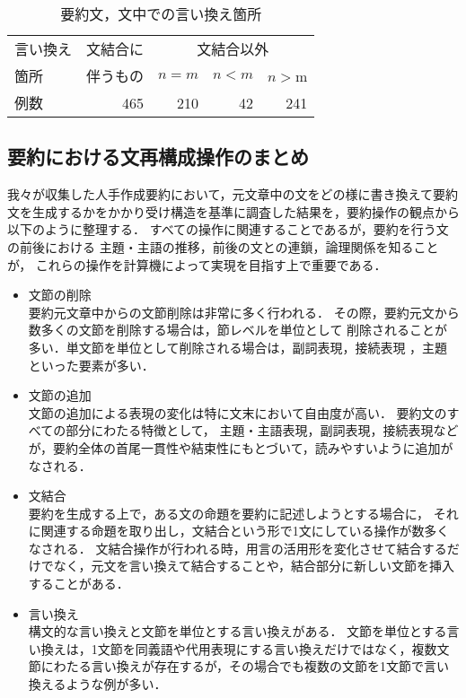\begin{table}
\caption{要約文，文中での言い換え箇所} 
\label{manu}
\begin{center}
\begin{tabular}{|l|r|r|r|r|}
\hline
言い換え&文結合に& \multicolumn{3}{|c|}{文結合以外}\\ \cline{3-5}
箇所    &伴うもの& $n=m$   & $n<m$ & $n>$m  \\ \hline \hline
例数    & 465    & 210     & 42     & 241  \\ \hline
\end{tabular}
\end{center}
\end{table}

\subsection{要約における文再構成操作のまとめ}

我々が収集した人手作成要約において，元文章中の文をどの様に書き換えて要約文を生成するかをかかり受け構造を基準に調査した結果を，要約操作の観点から以下のように整理する．
すべての操作に関連することであるが，要約を行う文の前後における
主題・主語の推移，前後の文との連鎖，論理関係を知ることが，
これらの操作を計算機によって実現を目指す上で重要である．

\begin{itemize}
\item 文節の削除\\
要約元文章中からの文節削除は非常に多く行われる．
その際，要約元文から数多くの文節を削除する場合は，節レベルを単位として
削除されることが多い．単文節を単位として削除される場合は，副詞表現，接続表現
，主題といった要素が多い．

\item 文節の追加\\
文節の追加による表現の変化は特に文末において自由度が高い．
要約文のすべての部分にわたる特徴として，
主題・主語表現，副詞表現，接続表現などが，要約全体の首尾一貫性や結束性にもとづいて，読みやすいように追加がなされる．

\item 文結合\\
要約を生成する上で，ある文の命題を要約に記述しようとする場合に，
それに関連する命題を取り出し，文結合という形で1文にしている操作が数多くなされる．
文結合操作が行われる時，用言の活用形を変化させて結合するだけでなく，元文を言い換えて結合することや，結合部分に新しい文節を挿入することがある．

\item 言い換え\\
構文的な言い換えと文節を単位とする言い換えがある．
文節を単位とする言い換えは，1文節を同義語や代用表現にする言い換えだけではなく，複数文節にわたる言い換えが存在するが，その場合でも複数の文節を1文節で言い換えるような例が多い．

\end{itemize}

